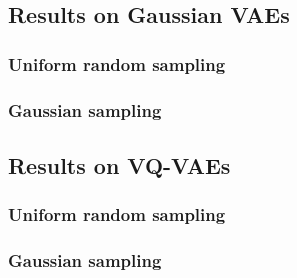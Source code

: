 \subsection{Results on Gaussian VAEs}

\subsubsection{Uniform random sampling}


\subsubsection{Gaussian sampling}

\subsection{Results on VQ-VAEs}

\subsubsection{Uniform random sampling}

\subsubsection{Gaussian sampling}



